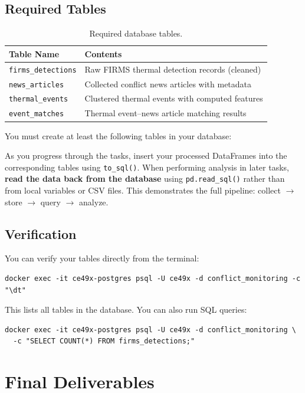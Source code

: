 \documentclass[11pt]{article}
\begin{document}
\subsection{Required Tables}

\begin{table}[h]
\centering
\begin{tabular}{ll}
\toprule
\textbf{Table Name} & \textbf{Contents} \\
\midrule
\texttt{firms\_detections} & Raw FIRMS thermal detection records (cleaned) \\
\texttt{news\_articles} & Collected conflict news articles with metadata \\
\texttt{thermal\_events} & Clustered thermal events with computed features \\
\texttt{event\_matches} & Thermal event--news article matching results \\
\bottomrule
\end{tabular}
\caption{Required database tables.}
\end{table}

You must create at least the following tables in your database:

As you progress through the tasks, insert your processed DataFrames into the corresponding tables using \texttt{to\_sql()}. When performing analysis in later tasks, \textbf{read the data back from the database} using \texttt{pd.read\_sql()} rather than from local variables or CSV files. This demonstrates the full pipeline: collect $\rightarrow$ store $\rightarrow$ query $\rightarrow$ analyze.

\subsection{Verification}
You can verify your tables directly from the terminal:
\begin{lstlisting}[style=shell]
docker exec -it ce49x-postgres psql -U ce49x -d conflict_monitoring -c "\dt"
\end{lstlisting}

This lists all tables in the database. You can also run SQL queries:
\begin{lstlisting}[style=shell]
docker exec -it ce49x-postgres psql -U ce49x -d conflict_monitoring \
  -c "SELECT COUNT(*) FROM firms_detections;"
\end{lstlisting}

\section{Final Deliverables}
\end{document}

